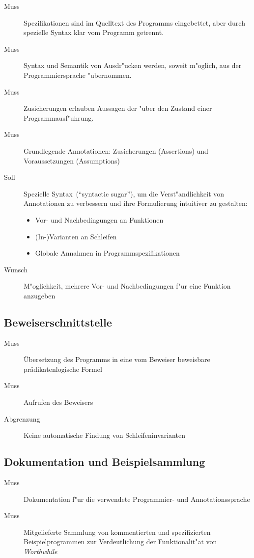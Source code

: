 \begin{description}%
    \item [Muss] Spezifikationen sind im Quelltext des Programms eingebettet, aber durch spezielle Syntax klar vom Programm getrennt.%
    \item [Muss] Syntax und Semantik von Ausdr"ucken werden, soweit m"oglich, aus der Programmiersprache "ubernommen.%
    \item [Muss] Zusicherungen erlauben Aussagen der  "uber den Zustand einer Programmausf"uhrung.%
    \item [Muss] Grundlegende Annotationen: Zusicherungen (Assertions) und Voraussetzungen (Assumptions)%
    \item [Soll] Spezielle Syntax~("`syntactic sugar"'), um die Verst"andlichkeit von Annotationen zu verbessern und ihre Formulierung intuitiver zu gestalten:%
        \begin{itemize}%
            \item Vor- und Nachbedingungen an Funktionen%
            \item (In-)Varianten an Schleifen%
            \item Globale Annahmen in Programmspezifikationen%
        \end{itemize}%
    \item [Wunsch] M"oglichkeit, mehrere Vor- und Nachbedingungen f"ur eine Funktion anzugeben%
\end{description}%

\subsection{Beweiserschnittstelle}%

\begin{description}%
    \item [Muss] Übersetzung des Programms in eine vom Beweiser beweisbare prädikatenlogische Formel
    \item [Muss] Aufrufen des Beweisers
    \item [Abgrenzung] Keine automatische Findung von Schleifeninvarianten
\end{description}%

\subsection{Dokumentation und Beispielsammlung}%

\begin{description}%
    \item [Muss] Dokumentation f"ur die verwendete Programmier- und Annotationssprache%
    \item [Muss] Mitgelieferte Sammlung von kommentierten und spezifizierten Beispielprogrammen zur Verdeutlichung der Funktionalit"at von \textit{Worthwhile}%
\end{description}%
